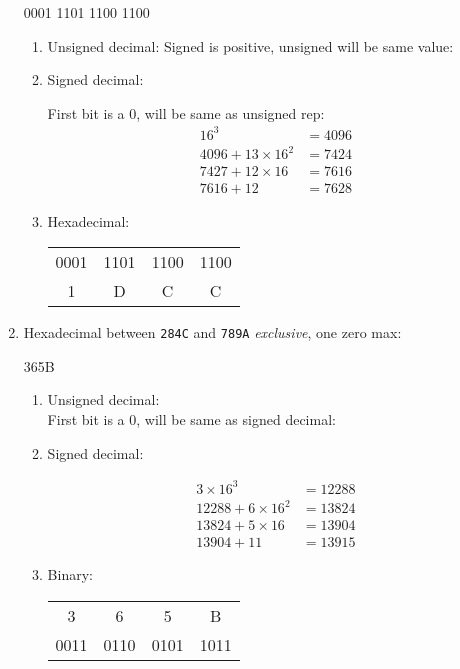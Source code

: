 \documentclass[11pt]{article}
\begin{document}
\begin{enumerate}
0001 1101 1100 1100

\begin{enumerate}
\item Unsigned decimal:
Signed is positive, unsigned will be same value: 

\item Signed decimal:

First bit is a 0, will be same as unsigned rep:\\

\begin{align*}
16^3 &= 4096\\
4096 + 13\times16^2 &= 7424\\
7427 + 12\times16 &= 7616\\
7616 + 12 &= \boxed{7628}
\end{align*}

\item Hexadecimal:

\begin{tabular}{c c c c}
0001 & 1101 & 1100 & 1100\\
1 & D & C & C
\end{tabular}


\end{enumerate}

\item Hexadecimal between \texttt{284C} and \texttt{789A} \emph{exclusive}, one zero max:

365B

\begin{enumerate}
\item Unsigned decimal:\\

First bit is a 0, will be same as signed decimal: \\

\item Signed decimal:

\begin{align*}
3\times16^3&=12288\\
12288+6\times16^2&=13824\\
13824 + 5\times16&=13904\\
13904 + 11&= \boxed{13915}
\end{align*}

\item Binary:

\begin{tabular}{c c c c}
3&6&5&B\\
0011&0110&0101&1011
\end{tabular}

\end{enumerate}

\end{enumerate}
\end{document}
